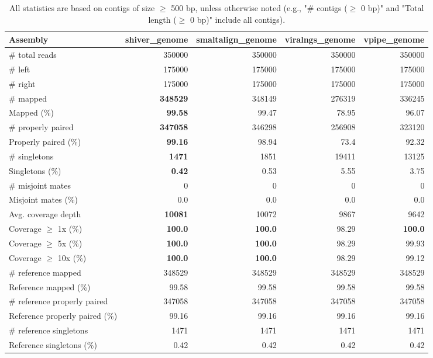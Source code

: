 \documentclass[12pt,a4paper]{article}
\begin{document}
\begin{table}[ht]
\begin{center}
\caption{All statistics are based on contigs of size $\geq$ 500 bp, unless otherwise noted (e.g., "\# contigs ($\geq$ 0 bp)" and "Total length ($\geq$ 0 bp)" include all contigs).}
\begin{tabular}{|l*{4}{|r}|}
\hline
Assembly & shiver\_genome & smaltalign\_genome & viralngs\_genome & vpipe\_genome \\ \hline
\# total reads & 350000 & 350000 & 350000 & 350000 \\ \hline
\# left & 175000 & 175000 & 175000 & 175000 \\ \hline
\# right & 175000 & 175000 & 175000 & 175000 \\ \hline
\# mapped & {\bf 348529} & 348149 & 276319 & 336245 \\ \hline
Mapped (\%) & {\bf 99.58} & 99.47 & 78.95 & 96.07 \\ \hline
\# properly paired & {\bf 347058} & 346298 & 256908 & 323120 \\ \hline
Properly paired (\%) & {\bf 99.16} & 98.94 & 73.4 & 92.32 \\ \hline
\# singletons & {\bf 1471} & 1851 & 19411 & 13125 \\ \hline
Singletons (\%) & {\bf 0.42} & 0.53 & 5.55 & 3.75 \\ \hline
\# misjoint mates & 0 & 0 & 0 & 0 \\ \hline
Misjoint mates (\%) & 0.0 & 0.0 & 0.0 & 0.0 \\ \hline
Avg. coverage depth & {\bf 10081} & 10072 & 9867 & 9642 \\ \hline
Coverage $\geq$ 1x (\%) & {\bf 100.0} & {\bf 100.0} & 98.29 & {\bf 100.0} \\ \hline
Coverage $\geq$ 5x (\%) & {\bf 100.0} & {\bf 100.0} & 98.29 & 99.93 \\ \hline
Coverage $\geq$ 10x (\%) & {\bf 100.0} & {\bf 100.0} & 98.29 & 99.12 \\ \hline
\# reference mapped & 348529 & 348529 & 348529 & 348529 \\ \hline
Reference mapped (\%) & 99.58 & 99.58 & 99.58 & 99.58 \\ \hline
\# reference properly paired & 347058 & 347058 & 347058 & 347058 \\ \hline
Reference properly paired (\%) & 99.16 & 99.16 & 99.16 & 99.16 \\ \hline
\# reference singletons & 1471 & 1471 & 1471 & 1471 \\ \hline
Reference singletons (\%) & 0.42 & 0.42 & 0.42 & 0.42 \\ \hline

\end{tabular}
\end{center}
\end{table}
\end{document}
